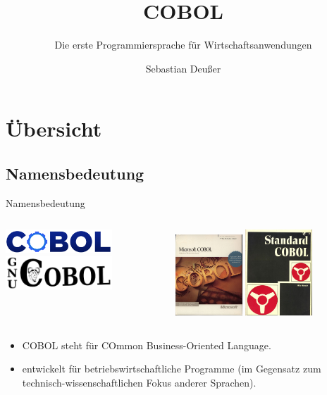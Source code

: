 \documentclass[handout]{beamer}
\title[COBOL-\"Uberblick]   %
{COBOL}
\subtitle
{Die erste Programmiersprache für Wirtschaftsanwendungen} %
\author %
{Sebastian Deußer}
\begin{document}
\begin{frame}
  \titlepage
\end{frame}


\section{Übersicht}
\subsection{Namensbedeutung}
\begin{frame}{Namensbedeutung}
	\begin{columns}[c]
		\begin{column}{4cm}
			\includegraphics[width=4cm]{CobolCogLogo}\\ 
			\includegraphics[width=4cm]{GnuCOBOLLogoTransparent}
		\end{column}
		\begin{column}{6cm}
			\includegraphics[width=2.5cm]{DOSMSCOBOL45} \hspace{1.5pt}
			\includegraphics[width=2.5cm]{StandardCobol}
		\end{column}
	\end{columns}
	\begin{itemize}[<+->]
		\item
			COBOL steht für COmmon Business-Oriented Language.
		\item
			entwickelt für betriebswirtschaftliche Programme (im Gegensatz zum technisch-wissenschaftlichen Fokus anderer Sprachen).
	\end{itemize}
\end{frame}
\end{document}
